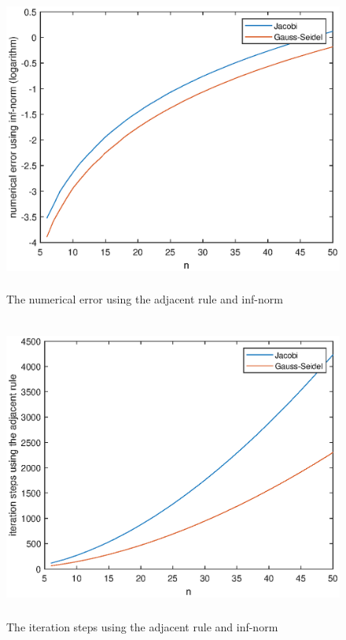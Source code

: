 \documentclass[UTF8,a4paper,10pt]{ctexart}
\begin{document}
\begin{figure}[ht]
    \centering
    \includegraphics[width=14cm,height=10cm]{2.1_error_adjacent_inf.eps}
    \caption{The numerical error using the adjacent rule and inf-norm}
\end{figure}
\begin{figure}[ht]
    \centering
    \includegraphics[width=14cm,height=10cm]{2.1_steps_adjacent_inf.eps}
    \caption{The iteration steps using the adjacent rule and inf-norm}
\end{figure}
\end{document}
